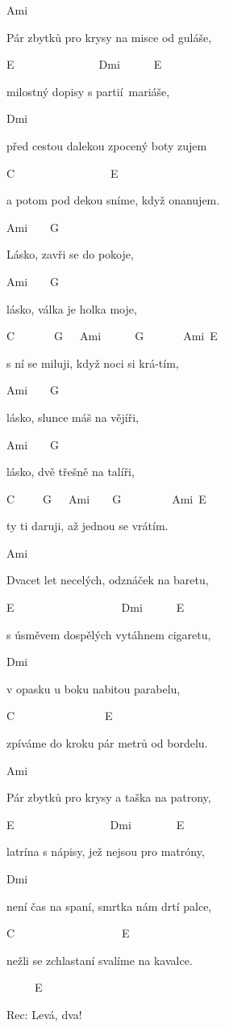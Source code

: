 
Ami

Pár zbytků pro krysy na misce od guláše,

E~~~~~~~~~~~~~~~Dmi~~~~~~E

milostný dopisy s partií~mariáše,

Dmi

před cestou dalekou zpocený boty zujem

C~~~~~~~~~~~~~~~~~E

a potom pod dekou sníme, když onanujem.

\bigskip

\begin{chorustext}
Ami~~~~G
    
Lásko, zavři se do pokoje,

Ami~~~~G

lásko, válka je holka moje,

C~~~~~~~G~~~Ami~~~~~~G~~~~~~~Ami~E

s ní se miluji, když noci si krá-tím,

Ami~~~~G

lásko, slunce máš na vějíři,

Ami~~~~G

lásko, dvě třešně na talíři,

C~~~~~G~~~Ami~~~~G~~~~~~~~~Ami~E

ty ti daruji, až jednou se vrátím.
\end{chorustext}

\bigskip

Ami

Dvacet let necelých, odznáček na baretu,

E~~~~~~~~~~~~~~~~~~~Dmi~~~~~~E

s úsměvem dospělých vytáhnem cigaretu,

Dmi

v opasku u boku nabitou parabelu,

C~~~~~~~~~~~~~~~~E

zpíváme do kroku pár metrů od bordelu.

\bigskip

\chorus

\bigskip

Ami

Pár zbytků pro krysy a taška na patrony,

E~~~~~~~~~~~~~~~~~Dmi~~~~~~~~E

latrína s nápisy, jež nejsou pro matróny,

Dmi

není čas na spaní, smrtka nám drtí palce,

C~~~~~~~~~~~~~~~~~~~E

nežli se zchlastaní svalíme na kavalce.

\bigskip

\chorus

\bigskip

~~~~~E

Rec: Levá, dva!

\bigskip

\chorus